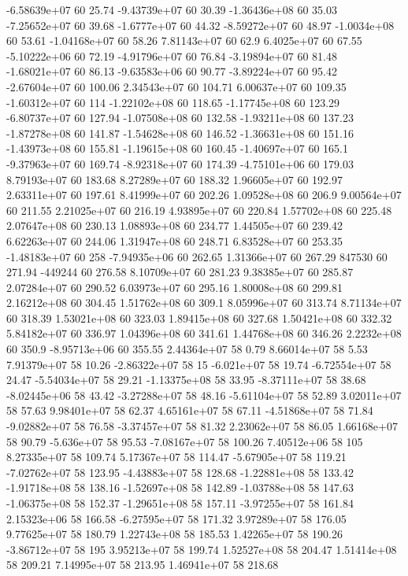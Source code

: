 -6.58639e+07 60 25.74
-9.43739e+07 60 30.39
-1.36436e+08 60 35.03
-7.25652e+07 60 39.68
-1.6777e+07 60 44.32
-8.59272e+07 60 48.97
-1.0034e+08 60 53.61
-1.04168e+07 60 58.26
7.81143e+07 60 62.9
6.4025e+07 60 67.55
-5.10222e+06 60 72.19
-4.91796e+07 60 76.84
-3.19894e+07 60 81.48
-1.68021e+07 60 86.13
-9.63583e+06 60 90.77
-3.89224e+07 60 95.42
-2.67604e+07 60 100.06
2.34543e+07 60 104.71
6.00637e+07 60 109.35
-1.60312e+07 60 114
-1.22102e+08 60 118.65
-1.17745e+08 60 123.29
-6.80737e+07 60 127.94
-1.07508e+08 60 132.58
-1.93211e+08 60 137.23
-1.87278e+08 60 141.87
-1.54628e+08 60 146.52
-1.36631e+08 60 151.16
-1.43973e+08 60 155.81
-1.19615e+08 60 160.45
-1.40697e+07 60 165.1
-9.37963e+07 60 169.74
-8.92318e+07 60 174.39
-4.75101e+06 60 179.03
8.79193e+07 60 183.68
8.27289e+07 60 188.32
1.96605e+07 60 192.97
2.63311e+07 60 197.61
8.41999e+07 60 202.26
1.09528e+08 60 206.9
9.00564e+07 60 211.55
2.21025e+07 60 216.19
4.93895e+07 60 220.84
1.57702e+08 60 225.48
2.07647e+08 60 230.13
1.08893e+08 60 234.77
1.44505e+07 60 239.42
6.62263e+07 60 244.06
1.31947e+08 60 248.71
6.83528e+07 60 253.35
-1.48183e+07 60 258
-7.94935e+06 60 262.65
1.31366e+07 60 267.29
847530 60 271.94
-449244 60 276.58
8.10709e+07 60 281.23
9.38385e+07 60 285.87
2.07284e+07 60 290.52
6.03973e+07 60 295.16
1.80008e+08 60 299.81
2.16212e+08 60 304.45
1.51762e+08 60 309.1
8.05996e+07 60 313.74
8.71134e+07 60 318.39
1.53021e+08 60 323.03
1.89415e+08 60 327.68
1.50421e+08 60 332.32
5.84182e+07 60 336.97
1.04396e+08 60 341.61
1.44768e+08 60 346.26
2.2232e+08 60 350.9
-8.95713e+06 60 355.55
2.44364e+07 58 0.79
8.66014e+07 58 5.53
7.91379e+07 58 10.26
-2.86322e+07 58 15
-6.021e+07 58 19.74
-6.72554e+07 58 24.47
-5.54034e+07 58 29.21
-1.13375e+08 58 33.95
-8.37111e+07 58 38.68
-8.02445e+06 58 43.42
-3.27288e+07 58 48.16
-5.61104e+07 58 52.89
3.02011e+07 58 57.63
9.98401e+07 58 62.37
4.65161e+07 58 67.11
-4.51868e+07 58 71.84
-9.02882e+07 58 76.58
-3.37457e+07 58 81.32
2.23062e+07 58 86.05
1.66168e+07 58 90.79
-5.636e+07 58 95.53
-7.08167e+07 58 100.26
7.40512e+06 58 105
8.27335e+07 58 109.74
5.17367e+07 58 114.47
-5.67905e+07 58 119.21
-7.02762e+07 58 123.95
-4.43883e+07 58 128.68
-1.22881e+08 58 133.42
-1.91718e+08 58 138.16
-1.52697e+08 58 142.89
-1.03788e+08 58 147.63
-1.06375e+08 58 152.37
-1.29651e+08 58 157.11
-3.97255e+07 58 161.84
2.15323e+06 58 166.58
-6.27595e+07 58 171.32
3.97289e+07 58 176.05
9.77625e+07 58 180.79
1.22743e+08 58 185.53
1.42265e+07 58 190.26
-3.86712e+07 58 195
3.95213e+07 58 199.74
1.52527e+08 58 204.47
1.51414e+08 58 209.21
7.14995e+07 58 213.95
1.46941e+07 58 218.68
